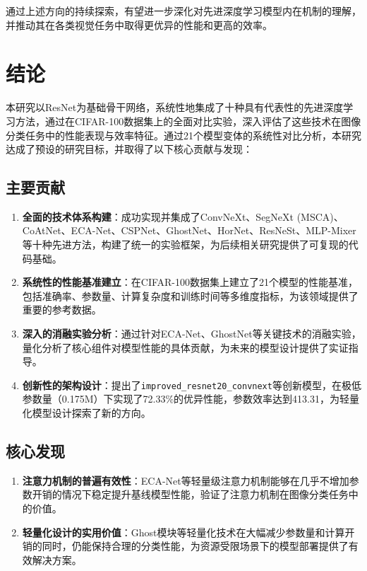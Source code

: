 \documentclass[a4paper]{article}
\begin{document}
\begin{description}
通过上述方向的持续探索，有望进一步深化对先进深度学习模型内在机制的理解，并推动其在各类视觉任务中取得更优异的性能和更高的效率。

\section{结论}
本研究以ResNet为基础骨干网络，系统性地集成了十种具有代表性的先进深度学习方法，通过在CIFAR-100数据集上的全面对比实验，深入评估了这些技术在图像分类任务中的性能表现与效率特征。通过21个模型变体的系统性对比分析，本研究达成了预设的研究目标，并取得了以下核心贡献与发现：

\subsection{主要贡献}
\begin{enumerate}
    \item \textbf{全面的技术体系构建}：成功实现并集成了ConvNeXt、SegNeXt (MSCA)、CoAtNet、ECA-Net、CSPNet、GhostNet、HorNet、ResNeSt、MLP-Mixer等十种先进方法，构建了统一的实验框架，为后续相关研究提供了可复现的代码基础。

    \item \textbf{系统性的性能基准建立}：在CIFAR-100数据集上建立了21个模型的性能基准，包括准确率、参数量、计算复杂度和训练时间等多维度指标，为该领域提供了重要的参考数据。

    \item \textbf{深入的消融实验分析}：通过针对ECA-Net、GhostNet等关键技术的消融实验，量化分析了核心组件对模型性能的具体贡献，为未来的模型设计提供了实证指导。

    \item \textbf{创新性的架构设计}：提出了\texttt{improved\_resnet20\_convnext}等创新模型，在极低参数量（0.175M）下实现了72.33\%的优异性能，参数效率达到413.31，为轻量化模型设计探索了新的方向。
\end{enumerate}

\subsection{核心发现}
\begin{enumerate}
    \item \textbf{注意力机制的普遍有效性}：ECA-Net等轻量级注意力机制能够在几乎不增加参数开销的情况下稳定提升基线模型性能，验证了注意力机制在图像分类任务中的价值。

    \item \textbf{轻量化设计的实用价值}：Ghost模块等轻量化技术在大幅减少参数量和计算开销的同时，仍能保持合理的分类性能，为资源受限场景下的模型部署提供了有效解决方案。


\end{enumerate}
\end{description}
\end{document}

